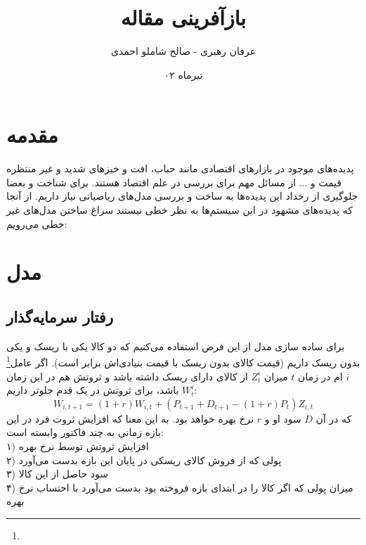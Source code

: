 \documentclass[13pt,onecolumn,a4paper]{article}
\title{بازآفرینی مقاله\\ \lr{Nonlinear asset-price dynamics and stabilization policies}}
\author{عرفان رهبری - صالح شاملو احمدی
}
\date{تیرماه ۰۲}
\begin{document}
	\maketitle

	\section{مقدمه}
	پدیده‌های موجود در بازارهای اقتصادی مانند حباب، افت و خیزهای شدید و غیر منتظره قیمت و ... از مسائل مهم برای بررسی در علم اقتصاد هستند. برای شناخت و بعضا جلوگیری از رخداد این پدیده‌ها به ساخت و بررسی مدل‌های ریاضیاتی نیاز داریم. از آنجا که پدیده‌های مشهود در این سیستم‌ها به نظر خطی نیستند سراغ ساختن مدل‌های غیر خطی می‌رویم:
	
	
	
	\section{مدل}
	\subsection{رفتار سرمایه‌گذار}
	برای ساده سازی مدل از این فرض استفاده می‌کنیم که دو کالا یکی با ریسک و یکی بدون ریسک داریم (قیمت کالای بدون ریسک با قیمت بنیادی‌اش برابر است). اگر عامل\footnote{} 
	$i$
	ام در زمان 
	$t$ 
	میزان 
	$Z_t^i$
	از کالای دارای ریسک داشته باشد و ثروتش هم در این زمان 
	$W_t^i$ 
	باشد، برای ثروتش در یک قدم جلوتر داریم:
	$$W_{i,t+1}=(1+r)W_{i,t}+\left(P_{t+1}+D_{t+1} - (1+r)P_t\right)Z_{i,t}$$
	که در آن 
	$D$
	سود او و 
	$r$ 
	نرخ بهره خواهد بود. به این معنا که افزایش ثروت فرد در این بازه زمانی به چند فاکتور وابسته است:\\
	
	۱)		افزایش ثروتش توسط نرخ بهره\\
	
	۲) 	پولی که از فروش کالای ریسکی در پایان این بازه بدست می‌آورد\\
	
	۳) 	سود حاصل از این کالا\\
	
	۴) 	میزان پولی که اگر کالا را در ابتدای بازه فروخته بود بدست می‌آورد با احتساب نرخ بهره\\
	
\end{document}
